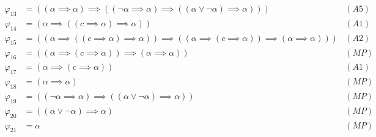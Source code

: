\begin{sol}
\begin{align*}
        \varphi_{13} & = ((\alpha\implies\alpha)\implies((\neg\alpha\implies\alpha)\implies((\alpha\vee\neg\alpha)\implies\alpha)))                               & (A5)  \\
        \varphi_{14} & = (\alpha\implies((c\implies\alpha)\implies\alpha))                                                                                        & (A1)  \\
        \varphi_{15} & = ((\alpha\implies((c\implies\alpha)\implies\alpha))\implies((\alpha\implies(c\implies\alpha))\implies(\alpha\implies\alpha)))             & (A2)  \\
        \varphi_{16} & = ((\alpha\implies(c\implies\alpha))\implies(\alpha\implies\alpha))                                                                        & (MP)  \\
        \varphi_{17} & = (\alpha\implies(c\implies\alpha))                                                                                                        & (A1)  \\
        \varphi_{18} & = (\alpha\implies\alpha)                                                                                                                   & (MP)  \\
        \varphi_{19} & = ((\neg\alpha\implies\alpha)\implies((\alpha\vee\neg\alpha)\implies\alpha))                                                               & (MP)  \\
        \varphi_{20} & = ((\alpha\vee\neg\alpha)\implies\alpha)                                                                                                   & (MP)  \\
        \varphi_{21} & = \alpha                                                                                                                                   & (MP)
    \end{align*}
\end{sol}

